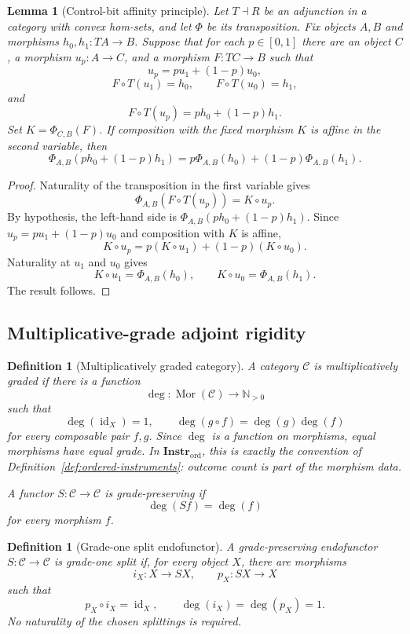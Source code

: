 \documentclass[11pt]{article}
\newtheorem{lemma}[theorem]{Lemma}
\newtheorem{definition}[theorem]{Definition}
\DeclareMathOperator{\id}{id}
\DeclareMathOperator{\Mor}{Mor}
\begin{document}
\begin{lemma}[Control-bit affinity principle]
\label{lem:control-bit-affinity}
Let $T\dashv R$ be an adjunction in a category with convex hom-sets, and
let $\Phi$ be its transposition. Fix objects $A,B$ and morphisms
$h_0,h_1:TA\to B$. Suppose that for each $p\in[0,1]$ there are an object
$C$, a morphism $u_p:A\to C$, and a morphism $F:TC\to B$ such that
\[
u_p=pu_1+(1-p)u_0,
\]
\[
F\circ T(u_1)=h_0,
\qquad
F\circ T(u_0)=h_1,
\]
and
\[
F\circ T(u_p)=ph_0+(1-p)h_1.
\]
Set $K=\Phi_{C,B}(F)$. If composition with the fixed morphism $K$ is affine
in the second variable, then
\[
\Phi_{A,B}(ph_0+(1-p)h_1)
=
p\Phi_{A,B}(h_0)+(1-p)\Phi_{A,B}(h_1).
\]
\end{lemma}

\begin{proof}
Naturality of the transposition in the first variable gives
\[
\Phi_{A,B}(F\circ T(u_p))=K\circ u_p.
\]
By hypothesis, the left-hand side is
$\Phi_{A,B}(ph_0+(1-p)h_1)$. Since $u_p=pu_1+(1-p)u_0$ and composition with
$K$ is affine,
\[
K\circ u_p=p(K\circ u_1)+(1-p)(K\circ u_0).
\]
Naturality at $u_1$ and $u_0$ gives
\[
K\circ u_1=\Phi_{A,B}(h_0),
\qquad
K\circ u_0=\Phi_{A,B}(h_1).
\]
The result follows.
\end{proof}

\subsection{Multiplicative-grade adjoint rigidity}

\begin{definition}[Multiplicatively graded category]
\label{def:multiplicatively-graded}
A category $\mathcal C$ is \emph{multiplicatively graded} if there is a
function
\[
\deg:\Mor(\mathcal C)\longrightarrow\mathbb N_{>0}
\]
such that
\[
\deg(\id_X)=1,
\qquad
\deg(g\circ f)=\deg(g)\deg(f)
\]
for every composable pair $f,g$. Since $\deg$ is a function on morphisms,
equal morphisms have equal grade. In $\mathbf{Instr}_{\mathrm{ord}}$, this
is exactly the convention of Definition~\ref{def:ordered-instruments}:
outcome count is part of the morphism data.

A functor $S:\mathcal C\to\mathcal C$ is \emph{grade-preserving} if
\[
\deg(Sf)=\deg(f)
\]
for every morphism $f$.
\end{definition}

\begin{definition}[Grade-one split endofunctor]
\label{def:grade-one-split}
A grade-preserving endofunctor $S:\mathcal C\to\mathcal C$ is
\emph{grade-one split} if, for every object $X$, there are morphisms
\[
i_X:X\to SX,
\qquad
p_X:SX\to X
\]
such that
\[
p_X\circ i_X=\id_X,
\qquad
\deg(i_X)=\deg(p_X)=1.
\]
No naturality of the chosen splittings is required.
\end{definition}
\end{document}
